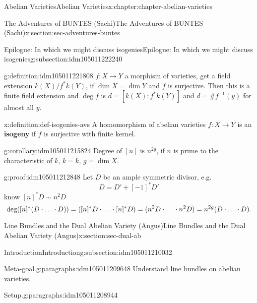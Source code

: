 \documentclass[oneside,10pt,]{book}
\newcommand{\terminology}[1]{\textbf{#1}}
\newcommand{\qedhere}{\relax}
\numberwithin{equation}{section}
\newcommand{\lb}{[}
\newcommand{\rb}{]}
\begin{document}
\begin{chapterptx}{Abelian Varieties}{}{Abelian Varieties}{}{}{x:chapter:chapter-abelian-varieties}
\begin{sectionptx}{The Adventures of BUNTES (Sachi)}{}{The Adventures of BUNTES (Sachi)}{}{}{x:section:sec-adventures-buntes}
\begin{subsectionptx}{Epilogue: In which we might discuss isogenies}{}{Epilogue: In which we might discuss isogenies}{}{}{g:subsection:idm105011222240}
\begin{definition}{}{g:definition:idm105011221808}%
\(f\colon X \to Y\) a morphism of varieties, get a field extension \(k(X)/f^*k(Y)\), if \(\dim X = \dim Y\) and \(f\) is surjective. Then this is a finite field extension and \(\deg f\) is \(d = \lb k(X) : f^*k(Y)\rb\) and \(d = \#f^{-1}(y)\) for almost all \(y\).%
\end{definition}
\begin{definition}{}{x:definition:def-isogenies-avs}%
A homomorphism of abelian varieties \(f\colon X \to Y\) is an \terminology{isogeny} if \(f\) is surjective with finite kernel.%
\end{definition}
\begin{corollary}{}{}{g:corollary:idm105011215824}%
Degree of \(\lb n\rb\) is \(n^{2g}\), if \(n\) is prime to the characteristic of \(k\), \(k = \overline k\), \(g = \dim X\).%
\end{corollary}
\begin{proofptx}{}{g:proof:idm105011212848}
Let \(D\) be an ample symmetric divisor, e.g.%
\begin{equation*}
D = D' + [-1]^* D'
\end{equation*}
know \(\lb n \rb^* D \sim n^2 D\)%
\begin{equation*}
\deg([n]^*(D\cdot\ldots\cdot D)) = ([n]^*D\cdot \ldots\cdot [n]^*D) = (n^2 D\cdot\ldots\cdot n^2 D)= n^{2g} (D\cdot \ldots\cdot D)\text{.}\qedhere
\end{equation*}
%
\end{proofptx}
\end{subsectionptx}
\end{sectionptx}
%
%
\typeout{************************************************}
\typeout{************************************************}
%
\begin{sectionptx}{Line Bundles and the Dual Abelian Variety (Angus)}{}{Line Bundles and the Dual Abelian Variety (Angus)}{}{}{x:section:sec-dual-ab}
%
%
\typeout{************************************************}
\typeout{************************************************}
%
\begin{subsectionptx}{Introduction}{}{Introduction}{}{}{g:subsection:idm105011210032}
\begin{paragraphs}{Meta-goal.}{g:paragraphs:idm105011209648}%
Understand line bundles on abelian varieties.%
\end{paragraphs}%
\begin{paragraphs}{Setup.}{g:paragraphs:idm105011208944}%

\end{paragraphs}
\end{subsectionptx}
\end{sectionptx}
\end{chapterptx}
\end{document}
